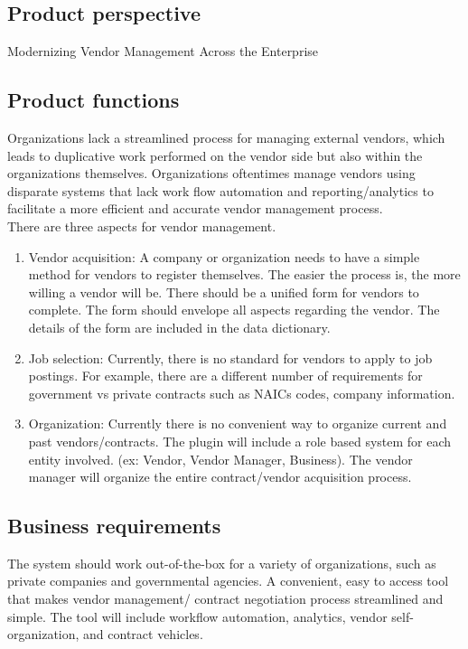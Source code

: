 \documentclass[10pt]{article}
\begin{document}
\subsection{Product perspective}

Modernizing Vendor Management Across the Enterprise

\subsection{Product functions}

Organizations lack a streamlined process for managing external vendors, which leads to duplicative work performed on the vendor side but also within the organizations themselves. Organizations oftentimes manage vendors using disparate systems that lack work flow automation and reporting/analytics to facilitate a more efficient and accurate vendor management process.\\

There are three aspects for vendor management.
\begin{enumerate}
	
		\item Vendor acquisition: A company or organization needs to have a simple method for vendors to register themselves. The easier the process is, the more willing a vendor will be. There should be a unified form for vendors to complete. The form should envelope all aspects regarding the vendor. The details of the form are included in the data dictionary.
		\item Job selection: Currently, there is no standard for vendors to apply to job postings. For example, there are a different number of requirements for government vs private contracts such as NAICs codes, company information. 
		\item Organization: Currently there is no convenient way to organize current and past vendors/contracts. The plugin will include a role based system for each entity involved. (ex: Vendor, Vendor Manager, Business). The vendor manager will organize the entire contract/vendor acquisition process. 
\end{enumerate}



\subsection{Business requirements}

The system should work out-of-the-box for a variety of organizations, such as private companies and governmental agencies. 
A convenient, easy to access tool that makes vendor management/ contract negotiation process streamlined and simple. The tool will include workflow automation, analytics, vendor self-organization, and contract vehicles. 
\end{document}
